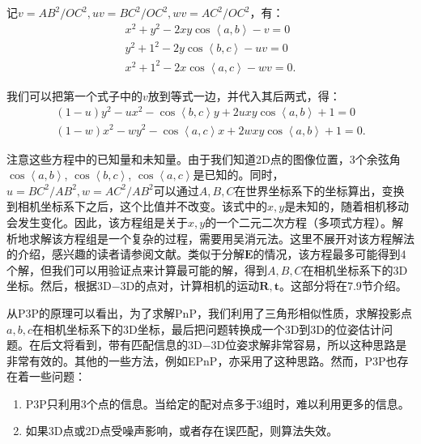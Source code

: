 记$v = AB^2/OC^2, uv = BC^2/OC^2, wv = AC^2/OC^2$，有：
\begin{equation}
\begin{array}{l}
{x^2} + {y^2} - 2xy\cos \left\langle a,b \right \rangle  - v = 0\\
{y^2} + {1^2} - 2y\cos \left\langle b,c \right \rangle  - uv = 0\\
{x^2} + {1^2} - 2x\cos \left\langle a,c \right \rangle  - wv = 0.
\end{array}
\end{equation}

我们可以把第一个式子中的$v$放到等式一边，并代入其后两式，得：
\begin{equation}
\begin{array}{l}
\left( {1 - u} \right){y^2} - u{x^2} - \cos \left\langle b,c \right \rangle y + 2uxy\cos \left\langle a,b \right \rangle  + 1 = 0 \\
\left( {1 - w} \right){x^2} - w{y^2} - \cos \left\langle a,c \right \rangle x + 2wxy\cos \left\langle a,b \right \rangle  + 1 = 0.
\end{array}
\end{equation}

注意这些方程中的已知量和未知量。由于我们知道2D点的图像位置，3个余弦角$\cos \left \langle a,b \right \rangle$, $\cos \left\langle b,c \right \rangle$, $\cos \left\langle a,c \right \rangle$是已知的。同时，$u=BC^2/AB^2, w=AC^2/AB^2$可以通过$A,B,C$在世界坐标系下的坐标算出，变换到相机坐标系下之后，这个比值并不改变。该式中的$x,y$是未知的，随着相机移动会发生变化。因此，该方程组是关于$x,y$的一个二元二次方程（多项式方程）。解析地求解该方程组是一个复杂的过程，需要用吴消元法。这里不展开对该方程解法的介绍，感兴趣的读者请参阅文献\cite{GaoHouTangEtAl2003}。类似于分解$\bm{E}$的情况，该方程最多可能得到4个解，但我们可以用验证点来计算最可能的解，得到$A,B,C$在相机坐标系下的3D坐标。然后，根据3D−3D的点对，计算相机的运动$\bm{R}, \bm{t}$。这部分将在7.9节介绍。

从P3P的原理可以看出，为了求解PnP，我们利用了三角形相似性质，求解投影点$a,b,c$在相机坐标系下的3D坐标，最后把问题转换成一个3D到3D的位姿估计问题。在后文将看到，带有匹配信息的3D−3D位姿求解非常容易，所以这种思路是非常有效的。其他的一些方法，例如EPnP，亦采用了这种思路。然而，P3P也存在着一些问题：

\begin{enumerate}
	\item P3P只利用3个点的信息。当给定的配对点多于3组时，难以利用更多的信息。
	\item 如果3D点或2D点受噪声影响，或者存在误匹配，则算法失效。
\end{enumerate}

